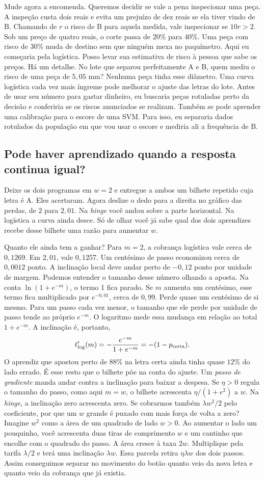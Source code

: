 \documentclass[12pt,oneside]{article}
\newcommand{\secao}[1]{\Needspace{5.2\baselineskip}\subsection*{#1}}
\newcommand{\bookanchor}[1]{\phantomsection\label{#1}}
\begin{document}
Mude\bookanchor{topic-06-10} agora a encomenda. Queremos decidir se vale a pena inspecionar uma peça. A inspeção custa dois reais e evita um prejuízo de dez reais se ela tiver vindo de B. Chamando de $r$ o risco de B para aquela medida, vale inspecionar se $10r>2$. Sob um preço de quatro reais, o corte passa de $20\%$ para $40\%$. Uma peça com risco de $30\%$ muda de destino sem que ninguém mexa no paquímetro. Aqui eu começaria pela logística. Posso levar sua estimativa de risco à pessoa que sabe os preços. Há um detalhe. No lote que separou perfeitamente A e B, quem mediu o risco de uma peça de $5{,}05$ mm? Nenhuma peça tinha esse diâmetro. Uma curva logística cada vez mais íngreme pode melhorar o ajuste das letras do lote. Antes de usar seu número para gastar dinheiro, eu buscaria peças rotuladas perto da decisão e conferiria se os riscos anunciados se realizam. Também se pode aprender uma calibração para o escore de uma SVM. Para isso, eu separaria dados rotulados da população em que vou usar o escore e mediria ali a frequência de B.

\secao{Pode haver aprendizado quando a resposta continua igual?}
Deixe os dois programas em $w=2$ e entregue a ambos um bilhete repetido cuja letra é A. Eles acertaram. Agora deslize o dedo para a direita no gráfico das perdas, de $2$ para $2{,}01$. Na \emph{hinge} você andou sobre a parte horizontal. Na logística a curva ainda desce. Só de olhar você já sabe qual dos dois aprendizes recebe desse bilhete uma razão para aumentar $w$.

Quanto ele ainda tem a ganhar? Para $m=2$, a cobrança logística vale cerca de $0{,}1269$. Em $2{,}01$, vale $0{,}1257$. Um centésimo de passo economizou cerca de $0{,}0012$ ponto. A inclinação local deve andar perto de $-0{,}12$ ponto por unidade de margem. Podemos entender o tamanho desse número olhando a aposta. Na conta $\ln(1+e^{-m})$, o termo 1 fica parado. Se $m$ aumenta um centésimo, esse termo fica multiplicado por $e^{-0{,}01}$, cerca de $0{,}99$. Perde quase um centésimo de si mesmo. Para um passo cada vez menor, o tamanho que ele perde por unidade de passo tende ao próprio $e^{-m}$. O logaritmo mede essa mudança em relação ao total $1+e^{-m}$. A inclinação é, portanto,
\[
 \ell'_{\rm log}(m)=-\frac{e^{-m}}{1+e^{-m}}=-(1-p_{\rm certa}).
\]
O\bookanchor{topic-06-11} aprendiz que apostou perto de $88\%$ na letra certa ainda tinha quase $12\%$ do lado errado. É esse resto que o bilhete põe na conta do ajuste. Um \emph{passo de gradiente} manda andar contra a inclinação para baixar a despesa. Se $\eta>0$ regula o tamanho do passo, como aqui $m=w$, o bilhete acrescenta $\eta/(1+e^2)$ a $w$. Na \emph{hinge}, a inclinação zero acrescenta zero. Se cobrarmos também $\lambda w^2/2$ pelo coeficiente, por que um $w$ grande é puxado com mais força de volta a zero? Imagine $w^2$ como a área de um quadrado de lado $w>0$. Ao aumentar o lado um pouquinho, você acrescenta duas tiras de comprimento $w$ e um cantinho que encolhe com o quadrado do passo. A área cresce à taxa $2w$. Multiplique pela tarifa $\lambda/2$ e terá uma inclinação $\lambda w$. Essa parcela retira $\eta\lambda w$ dos dois passos. Assim conseguimos separar no movimento do botão quanto veio da nova letra e quanto veio da cobrança que já existia.
\end{document}
